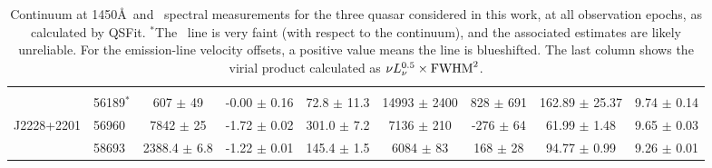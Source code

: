 \begin{table*}
\begin{centering}
\begin{tabular}{l  l | c c | c c c c | c}
                      &             &                               &                                &                              &                                 &                            &                                   &                            \\
                     & 56189$^*$ & 607 $\pm$ 49  &  -0.00 $\pm$ 0.16 &  72.8  $\pm$ 11.3 & 14993 $\pm$ 2400 &  828 $\pm$ 691   & 162.89 $\pm$ 25.37  &  9.74 $\pm$ 0.14\\  
 J2228+2201 & 56960   & 7842 $\pm$ 25     &  -1.72 $\pm$ 0.02 & 301.0  $\pm$ 7.2  &  7136 $\pm$  210   & -276 $\pm$  64   &  61.99 $\pm$  1.48  &    9.65 $\pm$ 0.03\\ 
              & 58693   & 2388.4 $\pm$ 6.8 &  -1.22 $\pm$ 0.01 & 145.4  $\pm$ 1.5  &  6084 $\pm$   83    &   168 $\pm$  28   &  94.77 $\pm$  0.99  &    9.26 $\pm$ 0.01\\
      \hline
      \hline
    \end{tabular}
    \caption{Continuum at 1450\AA\ and \civ\ spectral measurements for the
      three quasar considered in this work, at all observation epochs, as
      calculated by QSFit. $^{*}$The \civ\ line is very faint (with respect
      to the continuum), and the associated estimates are likely unreliable.
      For the emission-line velocity offsets, a positive value means the line is blueshifted. 
      The last column shows the virial product calculated as $\nu
      L_{\nu}^{0.5} \times {\rm FWHM}^2$.}
    \label{tab:QSFit-results}
  \end{centering}
\end{table*}